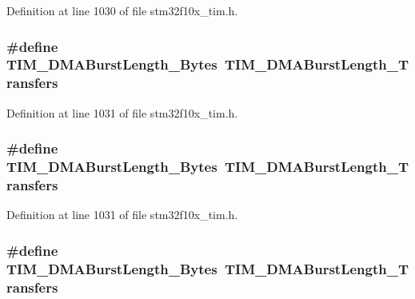 Definition at line 1030 of file stm32f10x\+\_\+tim.\+h.

\subsubsection[{\texorpdfstring{T\+I\+M\+\_\+\+D\+M\+A\+Burst\+Length\+\_\+12\+Bytes}{TIM_DMABurstLength_12Bytes}}]{\setlength{\rightskip}{0pt plus 5cm}\#define T\+I\+M\+\_\+\+D\+M\+A\+Burst\+Length\+\_\+Bytes~{\bf T\+I\+M\+\_\+\+D\+M\+A\+Burst\+Length\+\_\+Transfers}}\hypertarget{group___t_i_m___legacy_ga41a8cee7ca5e9035a04c0920ab0f3f66}{}\label{group___t_i_m___legacy_ga41a8cee7ca5e9035a04c0920ab0f3f66}


Definition at line 1031 of file stm32f10x\+\_\+tim.\+h.

\subsubsection[{\texorpdfstring{T\+I\+M\+\_\+\+D\+M\+A\+Burst\+Length\+\_\+12\+Bytes}{TIM_DMABurstLength_12Bytes}}]{\setlength{\rightskip}{0pt plus 5cm}\#define T\+I\+M\+\_\+\+D\+M\+A\+Burst\+Length\+\_\+Bytes~{\bf T\+I\+M\+\_\+\+D\+M\+A\+Burst\+Length\+\_\+Transfers}}\hypertarget{group___t_i_m___legacy_ga41a8cee7ca5e9035a04c0920ab0f3f66}{}\label{group___t_i_m___legacy_ga41a8cee7ca5e9035a04c0920ab0f3f66}


Definition at line 1031 of file stm32f10x\+\_\+tim.\+h.

\subsubsection[{\texorpdfstring{T\+I\+M\+\_\+\+D\+M\+A\+Burst\+Length\+\_\+13\+Bytes}{TIM_DMABurstLength_13Bytes}}]{\setlength{\rightskip}{0pt plus 5cm}\#define T\+I\+M\+\_\+\+D\+M\+A\+Burst\+Length\+\_\+Bytes~{\bf T\+I\+M\+\_\+\+D\+M\+A\+Burst\+Length\+\_\+Transfers}}\hypertarget{group___t_i_m___legacy_ga79a0397f1c33cc2d0a8b5bdd94eca845}{}\label{group___t_i_m___legacy_ga79a0397f1c33cc2d0a8b5bdd94eca845}


